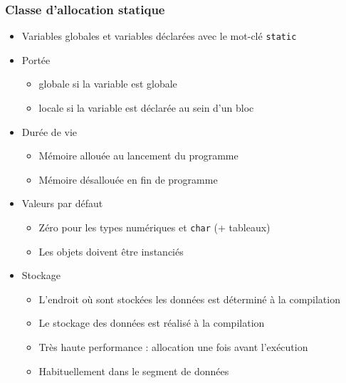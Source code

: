 \begin{frame}
\frametitle{Classe d'allocation statique}
\begin{itemize}[<+->]
\item Variables globales et variables déclarées avec le mot-clé \lstinline|static|
\item Portée
	\begin{itemize}
	\item globale si la variable est globale
	\item locale si la variable est déclarée au sein d'un bloc
	\end{itemize}
\item Durée de vie
	\begin{itemize}
	\item Mémoire allouée au lancement du programme
	\item Mémoire désallouée en fin de programme
	\end{itemize}
\item Valeurs par défaut
	\begin{itemize}
	\item Zéro pour les types numériques et \lstinline|char| (+ tableaux)
	\item Les objets doivent être instanciés
	\end{itemize}
\item Stockage
	\begin{itemize}
	\item L'endroit où sont stockées les données est déterminé à la compilation
	\item Le stockage des données est réalisé à la compilation
	\item Très haute performance : allocation une fois avant l'exécution
	\item Habituellement dans le segment de données
	\end{itemize}
\end{itemize}
\end{frame}

